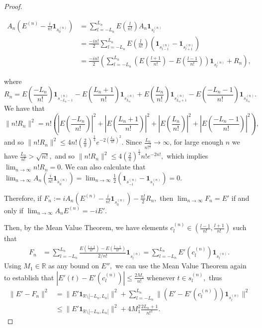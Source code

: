 \documentclass[10pt,a4paper]{amsart}
\begin{document}
\begin{proof}
	\begin{samepage}
	\begin{align*}
		A_n\left(E^{(n)}-\frac{i}{n!}\mathbf{1}_{s_0^{(n)}}\right)&=\sum_{l=-L_n}^{L_n}E\left(\frac{l}{n!}\right)A_n\mathbf{1}_{s_l^{(n)}}\\
		&=\frac{-in!}{2}\sum_{l=-L_n}^{L_n}E\left(\frac{l}{n!}\right)\left(\mathbf{1}_{s_{l-1}^{(n)}}-\mathbf{1}_{s_{l+1}^{(n)}}\right) \\
		&=\frac{-in!}{2}\left(\sum_{l=-L_n}^{L_n}\left(E\left(\frac{l+1}{n!}\right)-E\left(\frac{l-1}{n!}\right)\right)\mathbf{1}_{s_l^{(n)}}+R_n\right),
	\end{align*}
	\end{samepage}
	where $$R_n=E(\frac{-L_n}{n!})\mathbf{1}_{s_{-L_n-1}^{(n)}}-E(\frac{L_n+1}{n!})\mathbf{1}_{s_{L_n}^{(n)}}+E(\frac{L_n}{n!})\mathbf{1}_{s_{L_n+1}^{(n)}}-E(\frac{-L_n-1}{n!})\mathbf{1}_{s_{L_n}^{(n)}}.$$ We have that $$\|n!R_n\|^2=n!\left(|E(\frac{-L_n}{n!})|^2+|E(\frac{L_n+1}{n!})|^2+|E(\frac{L_n}{n!})|^2+|E(\frac{-L_n-1}{n!})|^2\right),$$ and so $\|n!R_n\|^2\leq 4n!\left(\frac{2}{\pi}\right)^{\frac{1}{4}}e^{-2(\frac{L_n}{n!})^2}$. Since $\frac{L_n}{n!^{\frac{3}{2}}}\rightarrow\infty$, for large enough $n$ we have $\frac{L_n}{n!}>\sqrt{n!},$ and so $\|n!R_n\|^2\leq 4\left(\frac{2}{\pi}\right)^{\frac{1}{4}}n!e^{-2 n!},$ which implies $\lim_{n\rightarrow\infty} n!R_n=0.$ We can also calculate that $\lim_{n\rightarrow\infty}A_n(\frac{i}{n!}\mathbf{1}_{s_0^{(n)}})=\lim_{n\rightarrow\infty}\frac{1}{2}(\mathbf{1}_{s_{-1}^{(n)}}-\mathbf{1}_{s_1^{(n)}})=0.$ 
	
	Therefore, if $F_n:=iA_n\left(E^{(n)}-\frac{i}{n!}\mathbf{1}_{s_0^{(n)}}\right)-\frac{n!}{2}R_n,$ then $\lim_{n\rightarrow\infty} F_n= E'$ if and only if $\lim_{n\rightarrow\infty}A_nE^{(n)}=-iE'.$
	
	Then, by the Mean Value Theorem, we have elements  $c_l^{(n)}\in(\frac{l-1}{n!},\frac{l+1}{n!})$ such that
	\begin{align*}
		F_n&=\sum_{l=-L_n}^{L_n}\frac{E\left(\frac{l+1}{n!}\right)-E\left(\frac{l-1}{n!}\right)}{2/n!}\mathbf{1}_{s_l^{(n)}}=\sum_{l=-L_n}^{L_n} E'(c_l^{(n)})\mathbf{1}_{s_l^{(n)}}.
	\end{align*}
	Using $M_1\in\mathbb{R}$ as any bound on $E'',$ we can use the Mean Value Theorem again to establish that $|E'(t)-E'(c_l^{(n)})|\leq\frac{2M_1}{n!}$ whenever $t\in s_l^{(n)},$ thus
	\begin{align*}
		\|E'-F_n\|^2&=\|E'\mathbf{1}_{\mathbb{R}\setminus[-L_n,L_n[}\|^2+\sum_{l=-L_n}^{L_n}\|(E'-E'(c_l^{(n)}))\mathbf{1}_{s_l^{(n)}}\|^2\\
		&\leq \|E'\mathbf{1}_{\mathbb{R}\setminus[-L_n,L_n[}\|^2+4M_1^2\frac{2L_n+1}{n!^3}.
	\end{align*}
	

\end{proof}
\end{document}
